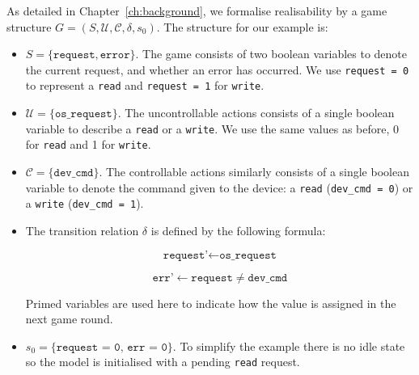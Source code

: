 As detailed in Chapter~\ref{ch:background}, we formalise realisability by a game structure $G = (S, \mathcal{U}, \mathcal{C}, \delta, s_0)$. The structure for our example is:

\begin{itemize}
    \item $S = \{ \texttt{request}, \texttt{error} \} $. The game consists of two boolean variables to denote the current request, and whether an error has occurred. We use \texttt{request = 0} to represent a \texttt{read} and \texttt{request = 1} for \texttt{write}.
    \item $\mathcal{U} = \{ \texttt{os\_request} \} $. The uncontrollable actions consists of a single boolean variable to describe a \texttt{read} or a \texttt{write}. We use the same values as before, 0 for \texttt{read} and 1 for \texttt{write}.
    \item $\mathcal{C} = \{ \texttt{dev\_cmd} \}$. The controllable actions similarly consists of a single boolean variable to denote the command given to the device: a \texttt{read} (\texttt{dev\_cmd = 0}) or a \texttt{write} (\texttt{dev\_cmd = 1}).
    \item The transition relation $\delta$ is defined by the following formula:

        $$ \texttt{request'} \gets \texttt{os\_request} $$

        $$ \texttt{err'} \gets \texttt{request} \neq \texttt{dev\_cmd} $$

        Primed variables are used here to indicate how the value is assigned in the next game round.

    \item $s_0 = \{ \texttt{request = 0, err = 0} \}$. To simplify the example there is no idle state so the model is initialised with a pending \texttt{read} request.

\end{itemize}


